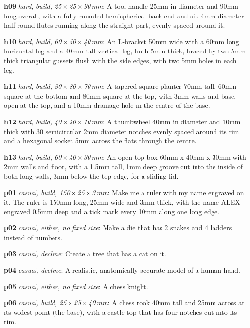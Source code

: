 {\noindent\textbf{h09} \emph{hard, build, 25\,$\times$\,25\,$\times$\,90\,mm}: A tool handle 25mm in diameter and 90mm long overall, with a fully rounded hemispherical back end and six 4mm diameter half-round flutes running along the straight part, evenly spaced around it.\par
\noindent\textbf{h10} \emph{hard, build, 60\,$\times$\,50\,$\times$\,40\,mm}: An L-bracket 50mm wide with a 60mm long horizontal leg and a 40mm tall vertical leg, both 5mm thick, braced by two 5mm thick triangular gussets flush with the side edges, with two 5mm holes in each leg.\par
\noindent\textbf{h11} \emph{hard, build, 80\,$\times$\,80\,$\times$\,70\,mm}: A tapered square planter 70mm tall, 60mm square at the bottom and 80mm square at the top, with 3mm walls and base, open at the top, and a 10mm drainage hole in the centre of the base.\par
\noindent\textbf{h12} \emph{hard, build, 40\,$\times$\,40\,$\times$\,10\,mm}: A thumbwheel 40mm in diameter and 10mm thick with 30 semicircular 2mm diameter notches evenly spaced around its rim and a hexagonal socket 5mm across the flats through the centre.\par
\noindent\textbf{h13} \emph{hard, build, 60\,$\times$\,40\,$\times$\,30\,mm}: An open-top box 60mm x 40mm x 30mm with 2mm walls and floor, with a 1.5mm tall, 1mm deep groove cut into the inside of both long walls, 3mm below the top edge, for a sliding lid.\par
\noindent\textbf{p01} \emph{casual, build, 150\,$\times$\,25\,$\times$\,3\,mm}: Make me a ruler with my name engraved on it. The ruler is 150mm long, 25mm wide and 3mm thick, with the name ALEX engraved 0.5mm deep and a tick mark every 10mm along one long edge.\par
\noindent\textbf{p02} \emph{casual, either, no fixed size}: Make a die that has 2 snakes and 4 ladders instead of numbers.\par
\noindent\textbf{p03} \emph{casual, decline}: Create a tree that has a cat on it.\par
\noindent\textbf{p04} \emph{casual, decline}: A realistic, anatomically accurate model of a human hand.\par
\noindent\textbf{p05} \emph{casual, either, no fixed size}: A chess knight.\par
\noindent\textbf{p06} \emph{casual, build, 25\,$\times$\,25\,$\times$\,40\,mm}: A chess rook 40mm tall and 25mm across at its widest point (the base), with a castle top that has four notches cut into its rim.\par
}
